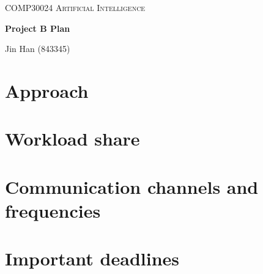 \documentclass{article}
\begin{document}
\begin{center}
\textsc{COMP30024 Artificial Intelligence}

\vspace{0.5em}
\textbf{\Large Project B Plan}

\vspace{0.5em}
{\small Jin Han (843345)}
\end{center}

\section*{Approach}
\section*{Workload share}
\section*{Communication channels and frequencies}
\section*{Important deadlines}
\end{document}
